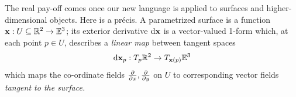 The real pay-off comes once our new language is applied to surfaces and higher-dimensional objects. Here is a précis. A parametrized surface is a function ${\mathbf{x}}:U\subseteq\mathbb{R}^2\to\mathbb{E}^3$; its exterior derivative $\mathrm{d}{\mathbf{x}}$ is a vector-valued 1-form which, at each point $p\in U$, describes a \emph{linear map} between tangent spaces
\[
	\mathrm{d}{\mathbf{x}}_p:T_p\mathbb{R}^2\to T_{{\mathbf{x}}(p)}\mathbb{E}^3
\]
which maps the co-ordinate fields $\frac{\partial }{\partial x},\frac{\partial }{\partial y}$ on $U$ to corresponding vector fields \emph{tangent to the surface.}

\clearpage

% 



